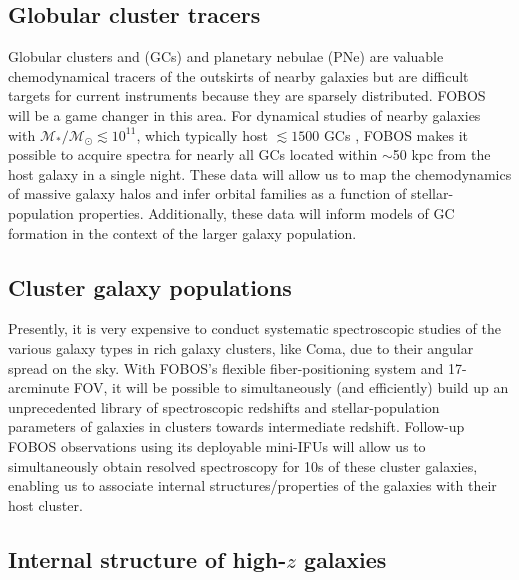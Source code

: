 
\subsection{Globular cluster tracers}

Globular clusters and (GCs) and planetary nebulae (PNe) are valuable chemodynamical tracers of the outskirts of nearby galaxies but are difficult targets for current instruments because they are sparsely distributed.  FOBOS
will be a game changer in this area.  For dynamical studies of nearby galaxies with $\mathcal{M_\ast/M_\odot}
\lesssim 10^{11}$, which typically host $\lesssim1500$ GCs
\citep{2013ApJ...772...82H}, FOBOS makes it possible to acquire spectra for nearly all GCs located within $\sim$50 kpc
from the host galaxy in a single night.  These data will allow us to map the chemodynamics of massive galaxy halos and
infer orbital families as a function of stellar-population properties. Additionally, these data will inform models of
GC formation in the context of the larger galaxy population.

\subsection{Cluster galaxy populations}

Presently, it is very expensive to conduct systematic spectroscopic
studies of the various galaxy types in rich galaxy clusters, like
Coma, due to their angular spread on the sky. With FOBOS's flexible
fiber-positioning system and 17-arcminute FOV, it will be possible to
simultaneously (and efficiently) build up an unprecedented library of
spectroscopic redshifts and stellar-population parameters of galaxies
in clusters towards intermediate redshift. Follow-up FOBOS
observations using its deployable mini-IFUs will allow us to
simultaneously obtain resolved spectroscopy for 10s of these cluster
galaxies, enabling us to associate internal structures/properties of
the galaxies with their host cluster.

\subsection{Internal structure of high-$z$ galaxies}

